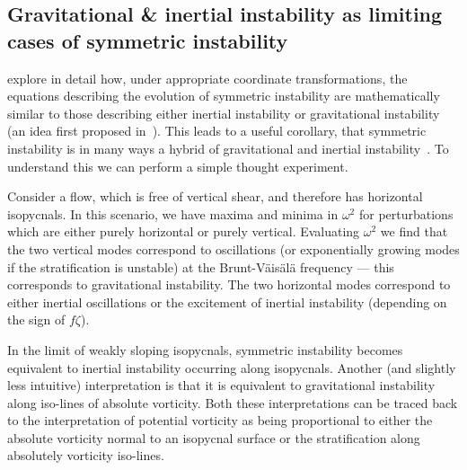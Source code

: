     \subsection{Gravitational \& inertial instability as limiting cases of symmetric instability}
    \citet{Xu1985} explore in detail how, under appropriate coordinate transformations, the equations describing the evolution of symmetric instability are mathematically similar to those describing either inertial instability or gravitational instability (an idea first proposed in~\citet{Hoskins1974}). This leads to a useful corollary, that symmetric instability is in many ways a hybrid of gravitational and inertial instability~\citep[e.g.][]{Haine1998}. To understand this we can perform a simple thought experiment.

    Consider a flow, which is free of vertical shear, and therefore has horizontal isopycnals. In this scenario, we have maxima and minima in $\omega^2$ for perturbations which are either purely horizontal or purely vertical. Evaluating $\omega^2$ we find that the two vertical modes correspond to oscillations (or exponentially growing modes if the stratification is unstable) at the Brunt-V\"ais\"al\"a frequency --- this corresponds to gravitational instability. The two horizontal modes correspond to either inertial oscillations or the excitement of inertial instability (depending on the sign of $f \zeta$).

    In the limit of weakly sloping isopycnals, symmetric instability becomes equivalent to inertial instability occurring along isopycnals. Another (and slightly less intuitive) interpretation is that it is equivalent to gravitational instability along iso-lines of absolute vorticity. Both these interpretations can be traced back to the interpretation of potential vorticity as being proportional to either the absolute vorticity normal to an isopycnal surface or the stratification along absolutely vorticity iso-lines.
    
